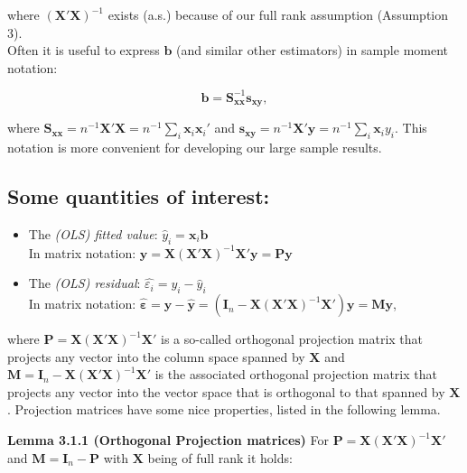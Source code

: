 \documentclass[]{book}
\theoremstyle{definition}
\theoremstyle{definition}
\theoremstyle{definition}
\theoremstyle{remark}
\begin{document}
where \((\mathbf{X}'\mathbf{X})^{-1}\) exists (a.s.) because of our full
rank assumption (Assumption 3).\\
Often it is useful to express \(\mathbf{b}\) (and similar other
estimators) in sample moment notation:

\[\mathbf{b}=\mathbf{S}_{\mathbf{x}\mathbf{x}}^{-1}\mathbf{s}_{\mathbf{x}\mathbf{y}},\]

where
\(\mathbf{S}_{\mathbf{x}\mathbf{x}}=n^{-1}\mathbf{X}'\mathbf{X}=n^{-1}\sum_i\mathbf{x}_i\mathbf{x}_i'\)
and
\(\mathbf{s}_{\mathbf{x}\mathbf{y}}=n^{-1}\mathbf{X}'\mathbf{y}=n^{-1}\sum_i\mathbf{x}_iy_i\).
This notation is more convenient for developing our large sample
results.\\

\hypertarget{some-quantities-of-interest}{%
\subsection*{Some quantities of interest:}\label{some-quantities-of-interest}}

\begin{itemize}
\item
  The \emph{(OLS) fitted value}: \(\hat{y}_i=\mathbf{x}_i\mathbf{b}\)\\
  In matrix notation:
  \(\hat{\mathbf{y}}=\mathbf{X}(\mathbf{X}'\mathbf{X})^{-1}\mathbf{X}'\mathbf{y} = \mathbf{P}\mathbf{y}\)
\item
  The \emph{(OLS) residual}: \(\hat{\varepsilon_i}=y_i-\hat{y}_i\)\\
  In matrix notation:
  \(\hat{\boldsymbol{\varepsilon}} = \mathbf{y}-\hat{\mathbf{y}} = \left(\mathbf{I}_n-\mathbf{X}(\mathbf{X}'\mathbf{X})^{-1}\mathbf{X}'\right)\mathbf{y} = \mathbf{M}\mathbf{y}\),
\end{itemize}

where \(\mathbf{P}=\mathbf{X}(\mathbf{X}'\mathbf{X})^{-1}\mathbf{X}'\) is
a so-called orthogonal projection matrix that projects any vector into
the column space spanned by \(\mathbf{X}\) and
\(\mathbf{M}=\mathbf{I}_n-\mathbf{X}(\mathbf{X}'\mathbf{X})^{-1}\mathbf{X}'\)
is the associated orthogonal projection matrix that projects any vector
into the vector space that is orthogonal to that spanned by
\(\mathbf{X}\). Projection matrices have some nice properties, listed in
the following lemma.

\textbf{Lemma 3.1.1 (Orthogonal Projection matrices)}
For \(\mathbf{P}=\mathbf{X}(\mathbf{X}'\mathbf{X})^{-1}\mathbf{X}'\) and
\(\mathbf{M}=\mathbf{I}_n-\mathbf{P}\) with \(\mathbf{X}\) being of full
rank it holds:
\end{document}
